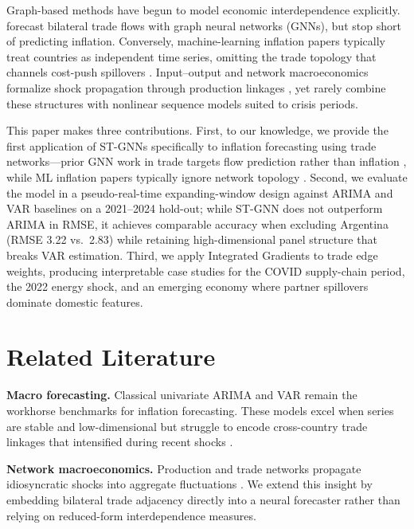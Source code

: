 \documentclass[12pt,a4paper]{article}
\begin{document}
Graph-based methods have begun to model economic interdependence explicitly.
\citet{monken2021predicting} forecast bilateral trade flows with graph neural networks (GNNs), but stop short of predicting inflation.
Conversely, machine-learning inflation papers typically treat countries as independent time series, omitting the trade topology that channels cost-push spillovers \citep{nason2025inflation}.
Input--output and network macroeconomics formalize shock propagation through production linkages \citep{galeotti2010network, baqaee2020networks}, yet rarely combine these structures with nonlinear sequence models suited to crisis periods.

This paper makes three contributions.
First, to our knowledge, we provide the first application of ST-GNNs specifically to inflation forecasting using trade networks---prior GNN work in trade targets flow prediction rather than inflation \citep{monken2021predicting}, while ML inflation papers typically ignore network topology \citep{nason2025inflation}.
Second, we evaluate the model in a pseudo-real-time expanding-window design against ARIMA and VAR baselines on a 2021--2024 hold-out; while ST-GNN does not outperform ARIMA in RMSE, it achieves comparable accuracy when excluding Argentina (RMSE 3.22 vs.\ 2.83) while retaining high-dimensional panel structure that breaks VAR estimation.
Third, we apply Integrated Gradients \citep{sundararajan2017axiomatic} to trade edge weights, producing interpretable case studies for the COVID supply-chain period, the 2022 energy shock, and an emerging economy where partner spillovers dominate domestic features.

\section{Related Literature}

\textbf{Macro forecasting.}
Classical univariate ARIMA \citep{box2015time} and VAR \citep{sims1980macroeconomics} remain the workhorse benchmarks for inflation forecasting.
These models excel when series are stable and low-dimensional but struggle to encode cross-country trade linkages that intensified during recent shocks \citep{forbes2001no}.

\textbf{Network macroeconomics.}
Production and trade networks propagate idiosyncratic shocks into aggregate fluctuations \citep{acemoglu2016networks, baqaee2020networks}.
We extend this insight by embedding bilateral trade adjacency directly into a neural forecaster rather than relying on reduced-form interdependence measures.
\end{document}
